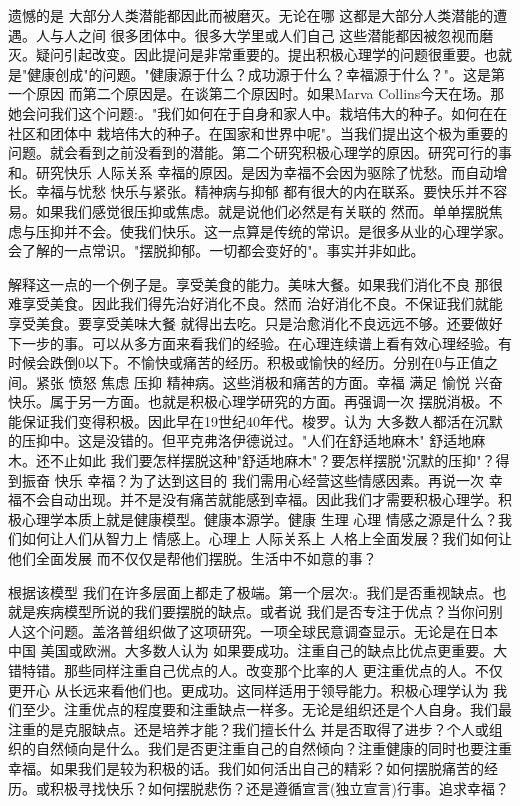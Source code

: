 遗憾的是 大部分人类潜能都因此而被磨灭。无论在哪 这都是大部分人类潜能的遭遇。人与人之间 很多团体中。很多大学里或人们自己 这些潜能都因被忽视而磨灭。疑问引起改变。因此提问是非常重要的。提出积极心理学的问题很重要。也就是"健康创成"的问题。"健康源于什么？成功源于什么？幸福源于什么？"。这是第一个原因 而第二个原因是。在谈第二个原因时。如果Marva Collins今天在场。那她会问我们这个问题:。"我们如何在于自身和家人中。栽培伟大的种子。如何在在社区和团体中 栽培伟大的种子。在国家和世界中呢"。当我们提出这个极为重要的问题。就会看到之前没看到的潜能。第二个研究积极心理学的原因。研究可行的事和。研究快乐 人际关系 幸福的原因。是因为幸福不会因为驱除了忧愁。而自动增长。幸福与忧愁 快乐与紧张。精神病与抑郁 都有很大的内在联系。要快乐并不容易。如果我们感觉很压抑或焦虑。就是说他们必然是有关联的 然而。单单摆脱焦虑与压抑并不会。使我们快乐。这一点算是传统的常识。是很多从业的心理学家。会了解的一点常识。"摆脱抑郁。一切都会变好的"。事实并非如此。 

解释这一点的一个例子是。享受美食的能力。美味大餐。如果我们消化不良 那很难享受美食。因此我们得先治好消化不良。然而 治好消化不良。不保证我们就能享受美食。要享受美味大餐 就得出去吃。只是治愈消化不良远远不够。还要做好下一步的事。可以从多方面来看我们的经验。在心理连续谱上看有效心理经验。有时候会跌倒0以下。不愉快或痛苦的经历。积极或愉快的经历。分别在0与正值之间。紧张 愤怒 焦虑 压抑 精神病。这些消极和痛苦的方面。幸福 满足 愉悦 兴奋 快乐。属于另一方面。也就是积极心理学研究的方面。再强调一次 摆脱消极。不能保证我们变得积极。因此早在19世纪40年代。梭罗。认为 大多数人都活在沉默的压抑中。这是没错的。但平克弗洛伊德说过。"人们在舒适地麻木" 舒适地麻木。还不止如此 我们要怎样摆脱这种"舒适地麻木"？要怎样摆脱"沉默的压抑"？得到振奋 快乐 幸福？为了达到这目的 我们需用心经营这些情感因素。再说一次 幸福不会自动出现。并不是没有痛苦就能感到幸福。因此我们才需要积极心理学。积极心理学本质上就是健康模型。健康本源学。健康 生理 心理 情感之源是什么？我们如何让人们从智力上 情感上。心理上 人际关系上 人格上全面发展？我们如何让他们全面发展 而不仅仅是帮他们摆脱。生活中不如意的事？ 

根据该模型 我们在许多层面上都走了极端。第一个层次:。我们是否重视缺点。也就是疾病模型所说的我们要摆脱的缺点。或者说 我们是否专注于优点？当你问别人这个问题。盖洛普组织做了这项研究。一项全球民意调查显示。无论是在日本 中国 美国或欧洲。大多数人认为 如果要成功。注重自己的缺点比优点更重要。大错特错。那些同样注重自己优点的人。改变那个比率的人 更注重优点的人。不仅更开心 从长远来看他们也。更成功。这同样适用于领导能力。积极心理学认为 我们至少。注重优点的程度要和注重缺点一样多。无论是组织还是个人自身。我们最注重的是克服缺点。还是培养才能？我们擅长什么 并是否取得了进步？个人或组织的自然倾向是什么。我们是否更注重自己的自然倾向？注重健康的同时也要注重幸福。如果我们是较为积极的话。我们如何活出自己的精彩？如何摆脱痛苦的经历。或积极寻找快乐？如何摆脱悲伤？还是遵循宣言(独立宣言)行事。追求幸福？ 

